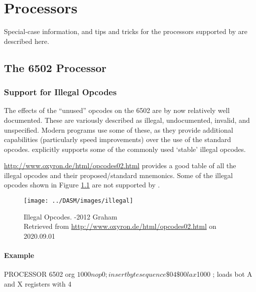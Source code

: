\label{changelog20200901_nop3}

\chapter{Processors}

Special-case information, and tips and tricks for the processors supported by \dasm are described here.

\section{The 6502 Processor}

\subsection{Support for Illegal Opcodes}

The effects of the ``unused'' opcodes on the 6502 are by now relatively well documented. These are variously described as illegal, undocumented, invalid, and unspecified. Modern programs use some of these, as they provide additional capabilities (particularly speed improvements) over the use of the standard opcodes. \dasm explicitly supports some of the commonly used `stable' illegal opcodes.

\url{http://www.oxyron.de/html/opcodes02.html} provides a good table of all the illegal opcodes and their proposed/standard mnemonics.  Some of the illegal opcodes shown in Figure \ref{fig:IllegalOp}  are not supported by \dasm.

\begin{landscape}
\begin{figure}[h]
\centering
\texttt{[image: ../DASM/images/illegal]}
\caption{Illegal Opcodes. -2012 Graham\\Retrieved from \url{http://www.oxyron.de/html/opcodes02.html} on 2020.09.01\\
}
\label{fig:IllegalOp}
\end{figure}

\end{landscape}

\subsubsection{Example}
\begin{code}
  PROCESSOR 6502
  org $1000
  nop 0       ; insert byte sequence \$04 \$00
  lax $1000   ; loads bot A and X registers with 4
\end{code}



